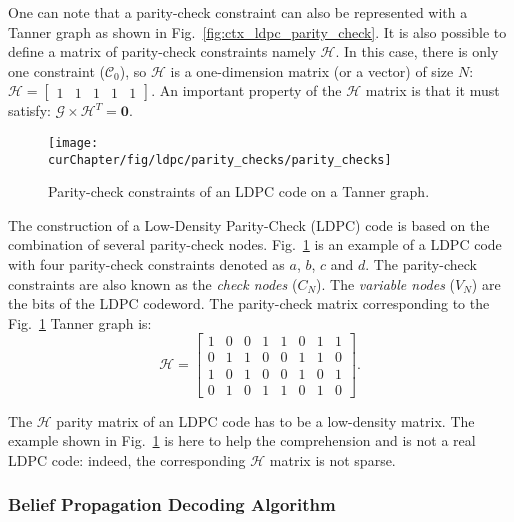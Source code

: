 One can note that a parity-check constraint can also be represented with a
Tanner graph as shown in Fig.~\ref{fig:ctx_ldpc_parity_check}. It is also
possible to define a matrix of parity-check constraints namely
$\bm{\mathcal{H}}$. In this case, there is only one constraint
($\mathcal{C}_0$), so $\bm{\mathcal{H}}$ is a one-dimension matrix (or a vector)
of size $N$:
$
\bm{\mathcal{H}} =
\begin{bmatrix}
1 & 1 & 1 & 1 & 1
\end{bmatrix}.
$
An important property of the $\bm{\mathcal{H}}$ matrix is that it must satisfy:
$\bm{\mathcal{G}} \times \bm{\mathcal{H}}^T = \bm{0}.$

\begin{figure}[htp]
  \centering
  \texttt{[image: \\curChapter/fig/ldpc/parity\_checks/parity\_checks]}
  \caption{Parity-check constraints of an LDPC code on a Tanner graph.}
  \label{fig:ctx_ldpc_parity_checks}
\end{figure}

The construction of a Low-Density Parity-Check (LDPC) code is based on the
combination of several parity-check nodes. Fig.~\ref{fig:ctx_ldpc_parity_checks}
is an example of a LDPC code with four parity-check constraints denoted as $a$,
$b$, $c$ and $d$. The parity-check constraints are also known as the \emph{check
nodes} ($C_N$). The \emph{variable nodes} ($V_N$) are the bits of the LDPC
codeword. The parity-check matrix corresponding to the
Fig.~\ref{fig:ctx_ldpc_parity_checks} Tanner graph is:
\begin{equation*}
\bm{\mathcal{H}} =
\begin{bmatrix}
  1 & 0 & 0 & 1 & 1 & 0 & 1 & 1\\
  0 & 1 & 1 & 0 & 0 & 1 & 1 & 0\\
  1 & 0 & 1 & 0 & 0 & 1 & 0 & 1\\
  0 & 1 & 0 & 1 & 1 & 0 & 1 & 0
\end{bmatrix}.
\end{equation*}

The $\bm{\mathcal{H}}$ parity matrix of an LDPC code has to be a low-density
matrix. The example shown in
Fig.~\ref{fig:ctx_ldpc_parity_checks} is here to help the comprehension and
is not a real LDPC code: indeed, the corresponding $\bm{\mathcal{H}}$ matrix is
not sparse.

\subsubsection{Belief Propagation Decoding Algorithm}

